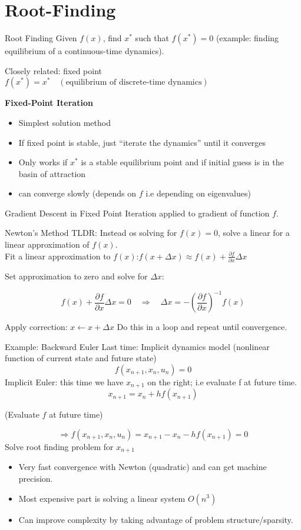 
\section{Root-Finding}

\begin{frame}{Root Finding}
Given $f(x)$, find $x^*$ such that $f(x^*) = 0$ (example: finding equilibrium of a continuous-time dynamics).

Closely related: fixed point \quad \quad \quad $f(x^*) = x^* \quad (\text{equilibrium of discrete-time dynamics})$

\textbf{Fixed-Point Iteration}
\begin{itemize}
    \item Simplest solution method
    \item If fixed point is stable, just “iterate the dynamics” until it converges
    \item Only works if $x^*$ is a stable equilibrium point and if initial guess is in the basin of attraction
    \item can converge slowly (depends on $f$ i.e depending on eigenvalues)
\end{itemize}
Gradient Descent in Fixed Point Iteration applied to gradient of function $f$.
\end{frame}



\begin{frame}{Newton's Method}
TLDR: Instead os solving for $f(x) =0$, solve a linear for a linear approximation of $f(x)$.\\
Fit a linear approximation to $f(x)$:\quad $f(x+\Delta x) \approx f(x) + \frac{\partial f}{\partial x}\Delta x$

Set approximation to zero and solve for $\Delta x$:

$$
f(x) + \frac{\partial f}{\partial x}\Delta x = 0 \quad \Rightarrow \quad \Delta x = -\left(\frac{\partial f}{\partial x}\right)^{-1} f(x)
$$

Apply correction: $x \leftarrow x + \Delta x$
Do this in a loop and repeat until convergence.

\end{frame}

\begin{frame}{Example: Backward Euler}
Last time: Implicit dynamics model (nonlinear function of current state and future state)
$$
f(x_{n+1}, x_n, u_n) = 0
$$
Implicit Euler: this time we have $x_{n+1}$ on the right; i.e evaluate f at future time.
$$
x_{n+1} = x_n + h f(x_{n+1})
$$

(Evaluate $f$ at future time)

$$
\Rightarrow f(x_{n+1}, x_n, u_n) = x_{n+1} - x_n - h f(x_{n+1}) = 0
$$
Solve root finding problem for $x_{n+1}$
\begin{itemize}
    \item Very fast convergence with Newton (quadratic) and can get machine precision.
    \item Most expensive part is solving a linear system $O(n^3)$
    \item Can improve complexity by taking advantage of problem structure/sparsity.
\end{itemize} 
\end{frame}


